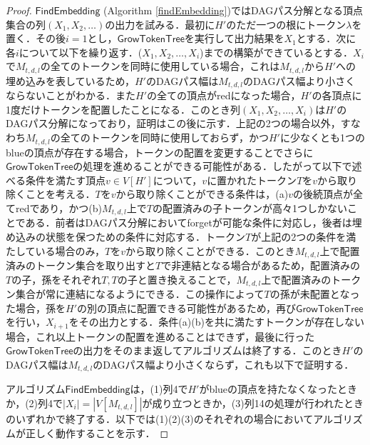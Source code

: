 \documentclass[master]{kuisthesis}		%
\theoremstyle{plain}
\theoremstyle{definition}
\begin{document}
\begin{proof}
$\mathsf{FindEmbedding}$ (Algorithm \ref{findEmbedding})ではDAGパス分解となる頂点集合の列$(X_1, X_2, \dots)$の出力を試みる．最初に$H'$のただ一つの根にトークン$\lambda$を置く．その後$i=1$とし，$\mathsf{GrowTokenTree}$を実行して出力結果を$X_1$とする．次に各$i$について以下を繰り返す．($X_1, X_2,  \dots , X_i$)までの構築ができているとする．$X_i$で$M_{t, d, l}$の全てのトークンを同時に使用している場合，これは$M_{t, d, l}$から$H'$への埋め込みを表しているため，$H'$のDAGパス幅は$M_{t, d, l}$のDAGパス幅より小さくならないことがわかる．また$H'$の全ての頂点がredになった場合，$H'$の各頂点に1度だけトークンを配置したことになる．このとき列$(X_1, X_2, \dots, X_i)$は$H'$のDAGパス分解になっており，証明はこの後に示す．上記の2つの場合以外，すなわち$M_{t, d, l}$の全てのトークンを同時に使用しておらず，かつ$H'$に少なくとも1つのblueの頂点が存在する場合，トークンの配置を変更することでさらに$\mathsf{GrowTokenTree}$の処理を進めることができる可能性がある．したがって以下で述べる条件を満たす頂点$v \in V[H']$について，$v$に置かれたトークン$T$を$v$から取り除くことを考える．$T$を$v$から取り除くことができる条件は，(a)$v$の後続頂点が全てredであり，かつ(b)$M_{t, d, l}$上で$T$の配置済みの子トークンが高々1つしかないことである．前者はDAGパス分解においてforgetが可能な条件に対応し，後者は埋め込みの状態を保つための条件に対応する．トークン$T$が上記の2つの条件を満たしている場合のみ，$T$を$v$から取り除くことができる．このとき$M_{t, d, l}$上で配置済みのトークン集合を取り出すと$T$で非連結となる場合があるため，配置済みの$T$の子，孫をそれぞれ$T, T$の子と置き換えることで，$M_{t, d, l}$上で配置済みのトークン集合が常に連結になるようにできる．この操作によって$T$の孫が未配置となった場合，孫を$H'$の別の頂点に配置できる可能性があるため，再び$\mathsf{GrowTokenTree}$を行い，$X_{i+1}$をその出力とする．条件(a)(b)を共に満たすトークンが存在しない場合，これ以上トークンの配置を進めることはできず，最後に行った$\mathsf{GrowTokenTree}$の出力をそのまま返してアルゴリズムは終了する．このとき$H'$のDAGパス幅は$M_{t, d, l}$のDAGパス幅より小さくならず，これも以下で証明する．

アルゴリズム$\mathsf{FindEmbedding}$は，(1)列4で$H'$がblueの頂点を持たなくなったときか，(2)列4で$|X_i| = |V[M_{t, d, l}]|$が成り立つときか，(3)列14の処理が行われたときのいずれかで終了する．以下では(1)(2)(3)のそれぞれの場合においてアルゴリズムが正しく動作することを示す．


\end{proof}
\end{document}
